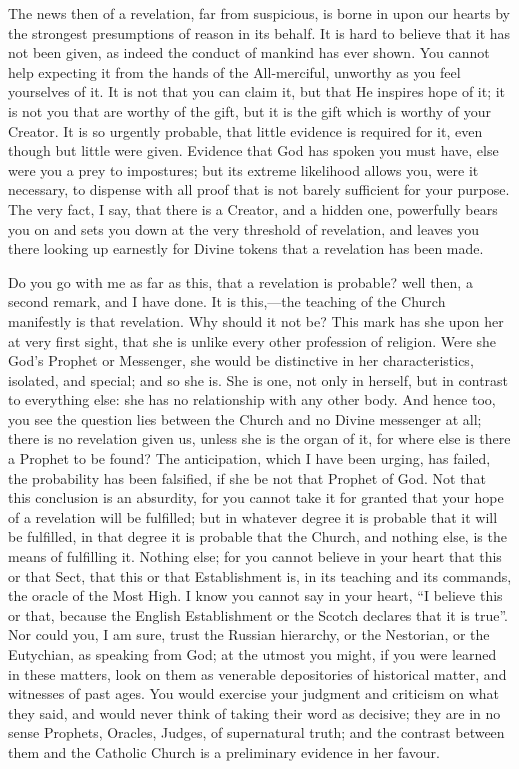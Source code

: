 The news then of a revelation, far from suspicious, is borne in
upon our hearts by the strongest presumptions of reason in its behalf.
It is hard to believe that it has not been given, as indeed the
conduct of mankind has ever shown. You cannot help expecting it from
the hands of the All-merciful, unworthy as you feel yourselves of it.
It is not that you can claim it, but that He inspires hope of it; it
is not you that are worthy of the gift, but it is the gift which is
worthy of your Creator. It is so urgently probable, that little
evidence is required for it, even though but little were given.
Evidence that God has spoken you must have, else were you a prey to
impostures; but its extreme likelihood allows you, were it necessary,
to dispense with all proof that is not barely sufficient for your
purpose. The very fact, I say, that there is a Creator, and a hidden
one, powerfully bears you on and sets you down at the very threshold
of revelation, and leaves you there looking up earnestly for Divine
tokens that a revelation has been made.

Do you go with me as far as this, that a revelation is probable?
well then, a second remark, and I have done. It is this,—the
teaching of the Church manifestly is that revelation. Why should it
not be? This mark has she upon her at very first sight, that she is
unlike every other profession of religion. Were she God's Prophet or
Messenger, she would be distinctive in her characteristics, isolated,
and special; and so she is. She is one, not only in herself, but in
contrast to everything else: she has no relationship with any other
body. And hence too, you see the question lies between the Church and
no Divine messenger at all; there is no revelation given us, unless
she is the organ of it, for where else is there a Prophet to be found?
The anticipation, which I have been urging, has failed, the
probability has been falsified, if she be not that Prophet of God. Not
that this conclusion is an absurdity, for you cannot take it for
granted that your hope of a revelation will be fulfilled; but in
whatever degree it is probable that it will be fulfilled, in that
degree it is probable that the Church, and nothing else, is the means
of fulfilling it. Nothing else; for you cannot believe in your heart
that this or that Sect, that this or that Establishment is, in its
teaching and its commands, the oracle of the Most High. I know you
cannot say in your heart, ``I believe this or that, because the
English Establishment or the Scotch declares that it is true''.
Nor could you, I am sure, trust the Russian hierarchy, or the
Nestorian, or the Eutychian, as speaking from God; at the utmost you
might, if you were learned in these matters, look on them as venerable
depositories of historical matter, and witnesses of past ages. You
would exercise your judgment and criticism on what they said, and
would never think of taking their word as decisive; they are in no
sense Prophets, Oracles, Judges, of supernatural truth; and the
contrast between them and the Catholic Church is a preliminary
evidence in her favour.

